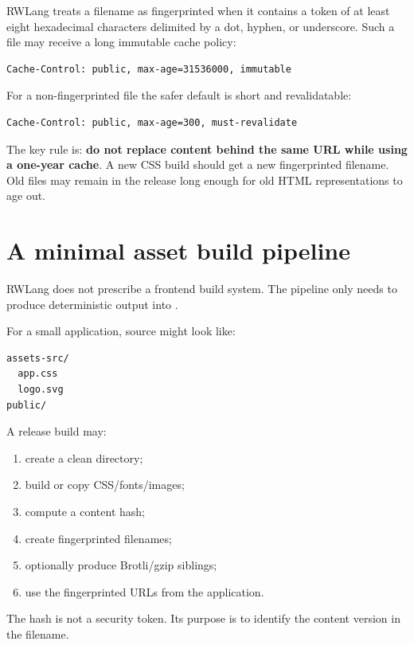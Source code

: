 RWLang treats a filename as fingerprinted when it contains a token of at least eight hexadecimal characters delimited by a dot, hyphen, or underscore. Such a file may receive a long immutable cache policy:

\begin{lstlisting}
Cache-Control: public, max-age=31536000, immutable
\end{lstlisting}

For a non-fingerprinted file the safer default is short and revalidatable:

\begin{lstlisting}
Cache-Control: public, max-age=300, must-revalidate
\end{lstlisting}

The key rule is: \textbf{do not replace content behind the same URL while using a one-year cache}. A new CSS build should get a new fingerprinted filename. Old files may remain in the release long enough for old HTML representations to age out.

\section{A minimal asset build pipeline}

RWLang does not prescribe a frontend build system. The pipeline only needs to produce deterministic output into .

For a small application, source might look like:

\begin{lstlisting}
assets-src/
  app.css
  logo.svg
public/
\end{lstlisting}

A release build may:

\begin{enumerate}
  \item create a clean  directory;
  \item build or copy CSS/fonts/images;
  \item compute a content hash;
  \item create fingerprinted filenames;
  \item optionally produce Brotli/gzip siblings;
  \item use the fingerprinted URLs from the application.
\end{enumerate}

The hash is not a security token. Its purpose is to identify the content version in the filename.

